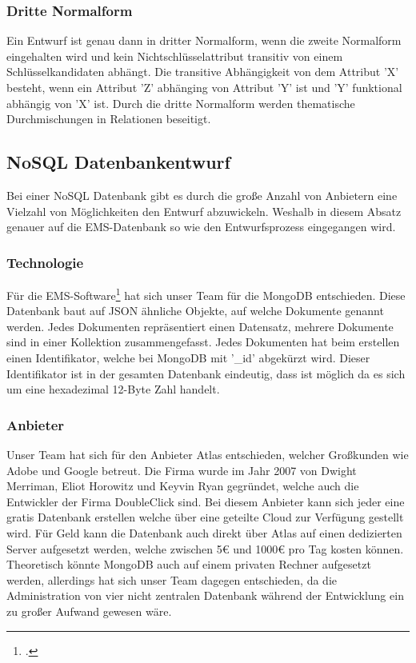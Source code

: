\subsubsection{Dritte Normalform}
Ein Entwurf ist genau dann in dritter Normalform, wenn die zweite Normalform eingehalten wird und kein Nichtschlüsselattribut transitiv von einem Schlüsselkandidaten abhängt. 
Die transitive Abhängigkeit von dem Attribut 'X' besteht, wenn ein Attribut 'Z' abhänging von Attribut 'Y' ist und 'Y' funktional abhängig von 'X' ist. 
Durch die dritte Normalform werden thematische Durchmischungen in Relationen beseitigt. 		
\subsection{NoSQL Datenbankentwurf}
Bei einer NoSQL Datenbank gibt es durch die große Anzahl von Anbietern eine Vielzahl von Möglichkeiten den Entwurf abzuwickeln. 
Weshalb in diesem Absatz genauer auf die EMS-Datenbank so wie den Entwurfsprozess eingegangen wird. 
\subsubsection{Technologie}
Für die EMS-Software\footcite{mongohistory} hat sich unser Team für die MongoDB entschieden. Diese Datenbank baut auf JSON ähnliche Objekte, auf welche Dokumente genannt werden. 
Jedes Dokumenten repräsentiert einen Datensatz, mehrere Dokumente sind in einer Kollektion zusammengefasst. 
Jedes Dokumenten hat beim erstellen einen Identifikator, welche bei MongoDB mit '\_id' abgekürzt wird. 
Dieser Identifikator ist in der gesamten Datenbank eindeutig, dass ist möglich da es sich um eine hexadezimal 12-Byte Zahl handelt. 
\subsubsection{Anbieter}
Unser Team hat sich für den Anbieter Atlas entschieden, welcher Großkunden wie Adobe und Google betreut. 
Die Firma wurde im Jahr 2007 von Dwight Merriman, Eliot Horowitz und Keyvin Ryan gegründet, welche auch die Entwickler der Firma DoubleClick sind. 
Bei diesem Anbieter kann sich jeder eine gratis Datenbank erstellen welche über eine geteilte Cloud zur Verfügung gestellt wird. 
Für Geld kann die Datenbank auch direkt über Atlas auf einen dedizierten Server aufgesetzt werden, welche zwischen 5€ und 1000€ pro Tag kosten können. 
Theoretisch könnte MongoDB auch auf einem privaten Rechner aufgesetzt werden, allerdings hat sich unser Team dagegen entschieden, da die Administration von vier nicht zentralen Datenbank während der Entwicklung ein zu großer Aufwand gewesen wäre.
